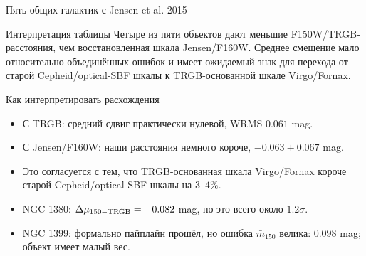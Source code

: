 \documentclass[aspectratio=169, 11pt]{beamer}
\begin{document}
\begin{frame}{Пять общих галактик с Jensen et al. 2015}
    \centering
    \scriptsize
    \setlength{\tabcolsep}{3pt}

    \vspace{0.35cm}
    \begin{block}{Интерпретация таблицы}
        Четыре из пяти объектов дают меньшие F150W/TRGB-расстояния, чем восстановленная шкала Jensen/F160W. Среднее смещение мало относительно объединённых ошибок и имеет ожидаемый знак для перехода от старой Cepheid/optical-SBF шкалы к TRGB-основанной шкале Virgo/Fornax.
    \end{block}
\end{frame}

\begin{frame}{Как интерпретировать расхождения}
    \begin{itemize}
        \item С TRGB: средний сдвиг практически нулевой, WRMS $0.061$ mag.
        \item С Jensen/F160W: наши расстояния немного короче, $-0.063\pm0.067$ mag.
        \item Это согласуется с тем, что TRGB-основанная шкала Virgo/Fornax короче старой Cepheid/optical-SBF шкалы на $3$--$4\%$.
        \item NGC 1380: $\Delta\mu_{150-\rm TRGB}=-0.082$ mag, но это всего около $1.2\sigma$.
        \item NGC 1399: формально пайплайн прошёл, но ошибка $\bar{m}_{150}$ велика: $0.098$ mag; объект имеет малый вес.
    \end{itemize}
\end{frame}
\end{document}
